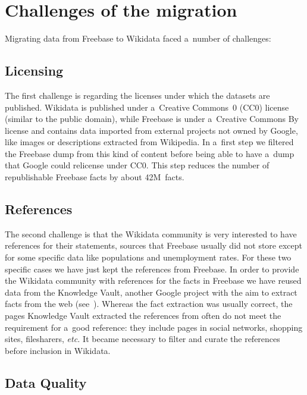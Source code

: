 \documentclass{sig-alternate}
\begin{document}
\section{Challenges of the migration}\label{sec:challenges-of-the-migration}

Migrating data from Freebase to Wikidata faced a~number of challenges:

\subsection{Licensing}
\label{sec-licensing}

The first challenge is regarding the licenses under which the datasets are published.
Wikidata is published under a~Creative Commons~0 (CC0) license (similar to the public domain),
while Freebase is under a~Creative Commons By license and contains data
imported from external projects not owned by Google,
like images or descriptions extracted from Wikipedia.
In a~first step we filtered the Freebase dump from this kind of content
before being able to have a~dump that Google could relicense under CC0.
This step reduces the number of republishable Freebase facts by about 42M~facts.

\subsection{References}

The second challenge is that the Wikidata community is very interested to have references
for their statements, sources that Freebase usually did not store except for
some specific data like populations and unemployment rates.
For these two specific cases we have just kept the references from Freebase.
In order to provide the Wikidata community with references for the facts in Freebase
we have reused data from the Knowledge Vault, another Google project with the aim
to extract facts from the web (see~\cite{dong2014knowledge}).
Whereas the fact extraction was usually correct, the pages Knowledge Vault extracted
the references from often do not meet the requirement for a~good reference:
they include pages in social networks, shopping sites, filesharers, \emph{etc.}
It became necessary to filter and curate the references before inclusion in Wikidata.

\subsection{Data Quality}
\end{document}
